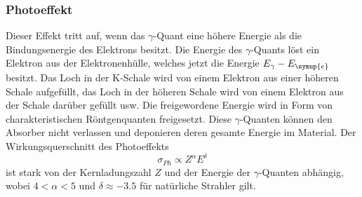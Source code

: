 \subsubsection{Photoeffekt}
Dieser Effekt tritt auf, wenn das $\gamma$-Quant eine höhere Energie als die Bindungsenergie des Elektrons besitzt.
Die Energie des $\gamma$-Quants löst ein Elektron aus der Elektronenhülle, welches jetzt die Energie $E_\gamma-E_{\symup{e}}$ besitzt.
Das Loch in der K-Schale wird von einem Elektron aus einer höheren Schale aufgefüllt, das Loch in der höheren Schale wird von einem Elektron aus der Schale darüber gefüllt usw.
Die freigewordene Energie wird in Form von charakteristischen Röntgenquanten freigesetzt.
Diese $\gamma$-Quanten können den Absorber nicht verlassen und deponieren deren gesamte Energie im Material.
Der Wirkungsquerschnitt des Photoeffekts
\begin{equation*}
\sigma_{Ph}\propto Z^\alpha E^\delta
\end{equation*}
ist stark von der Kernladungszahl $Z$ und der Energie der $\gamma$-Quanten abhängig, wobei $4<\alpha<5$ und $\delta\approx -3.5$ für natürliche Strahler gilt.


